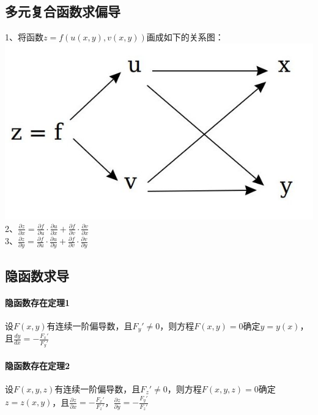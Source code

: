 \documentclass{article}
\begin{document}
\begin{flushleft}
	\subsection{多元复合函数求偏导}
	
	1、将函数$z=f(u(x,y),v(x,y))$画成如下的关系图：\\
	\includegraphics[scale=0.5]{lsqdfz.jpg}\\
	2、$\frac{\partial z}{\partial x}=\frac{\partial f}{\partial u}\cdot\frac{\partial u}{\partial x}+\frac{\partial f}{\partial v}\cdot\frac{\partial v}{\partial x}$\\
	3、$\frac{\partial z}{\partial y}=\frac{\partial f}{\partial u}\cdot\frac{\partial u}{\partial y}+\frac{\partial f}{\partial v}\cdot\frac{\partial v}{\partial y}$\\
	
	\subsection{隐函数求导}
	
	\paragraph{隐函数存在定理1}
	设$F(x,y)$有连续一阶偏导数，且$F_y'\neq 0$，则方程$F(x,y)=0$确定$y=y(x)$，且$\frac{dy}{dx}=-\frac{F_x'}{F_y'}$\\
	
	\paragraph{隐函数存在定理2}
	设$F(x,y,z)$有连续一阶偏导数，且$F_z'\neq 0$，则方程$F(x,y,z)=0$确定$z=z(x,y)$，且$\frac{\partial z}{\partial x}=-\frac{F_x'}{F_z'}$，$\frac{\partial z}{\partial y}=-\frac{F_y'}{F_z'}$\\
	

\end{flushleft}
\end{document}
